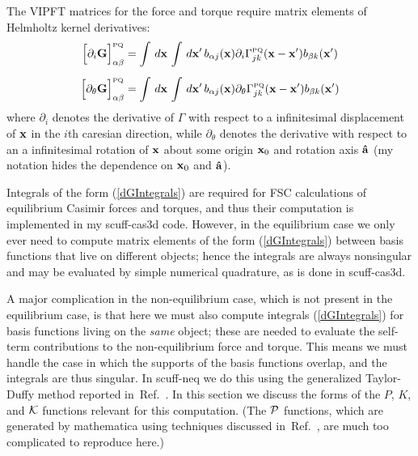 \documentclass[letterpaper]{article}
\newcommand{\citeasnoun}[1]{Ref.~\citenum{#1}}
\begin{document}
The VIPFT matrices for the force and torque require matrix
elements of Helmholtz kernel derivatives: 
\begin{subequations}
\begin{align}
 \Big[\partial_i \mathbf{G}\Big]^{\hbox{\tiny{PQ}}}_{\alpha \beta}
&= \int\, d\mathbf{x} \, \int \, d\mathbf{x}^\prime \,
   b_{\alpha j}(\mathbf{x}) \partial_i \Gamma_{jk}^{\hbox{\tiny{PQ}}}(\mathbf{x}-\mathbf{x}^\prime)
   b_{\beta k}(\mathbf{x}^\prime)
\\[5pt]
 \Big[\partial_\theta \mathbf{G}\Big]^{\hbox{\tiny{PQ}}}_{\alpha \beta}
&= \int\, d\mathbf{x} \, \int \, d\mathbf{x}^\prime \,
   b_{\alpha j}(\mathbf{x}) 
   \partial_\theta \Gamma_{jk}^{\hbox{\tiny{PQ}}}(\mathbf{x}-\mathbf{x}^\prime)
   b_{\beta k}(\mathbf{x}^\prime)
\end{align}
\label{dGIntegrals}
\end{subequations}
where $\partial_i$ denotes the derivative of $\Gamma$ 
with respect to a infinitesimal displacement of $\mathbf{x}$
in the $i$th caresian direction, 
while $\partial_\theta$ denotes the derivative with respect to an a
infinitesimal rotation of $\mathbf{x}$ about some origin $\mathbf{x}_0$ and 
rotation axis $\mathbf{\hat a}$ (my notation hides the dependence on 
$\mathbf{x}_0$ and $\mathbf{\hat a}$).

Integrals of the form (\ref{dGIntegrals}) are required for 
FSC calculations of equilibrium Casimir forces and torques,
and thus their computation is implemented in my {\sc scuff-cas3d} code.
However, in the equilibrium case we only ever need to compute
matrix elements of the form (\ref{dGIntegrals}) between basis
functions that live on different objects; hence the integrals
are always nonsingular and may be evaluated by simple 
numerical quadrature, as is done in {\sc scuff-cas3d}.

A major complication in the non-equilibrium case, which is
not present in the equilibrium case, is that here we must
also compute integrals (\ref{dGIntegrals}) for basis
functions living on the \textit{same} object; these are needed 
to evaluate the self-term contributions to the non-equilibrium
force and torque. This means we must handle the case in
which the supports of the basis functions overlap, and the
integrals are thus singular. In {\sc scuff-neq} we do this
using the generalized Taylor-Duffy method reported 
in~\citeasnoun{Reid2013C}. In this section we discuss the 
forms of the $P$, $K$, and $\mathcal{K}$ functions relevant for
this computation. (The $\mathcal{P}$ functions, which are generated
by {\sc mathematica} using techniques discussed in~\citeasnoun{Reid2013C},
are much too complicated to reproduce here.)
\end{document}
